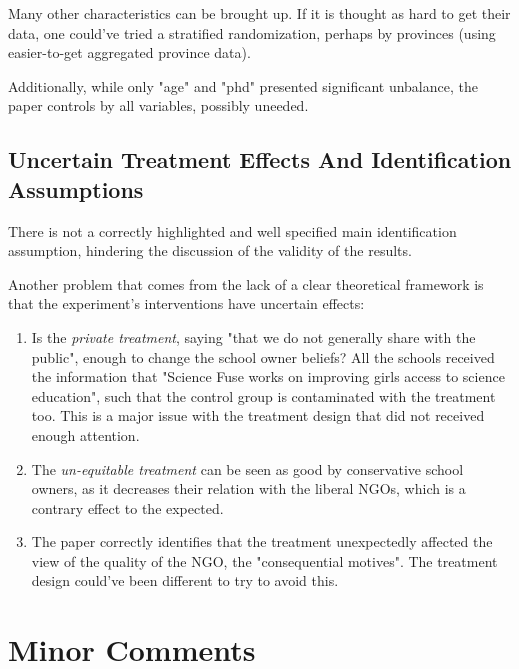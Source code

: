 \documentclass[12pt]{article}
\begin{document}
Many other characteristics can be brought up. If it is thought as hard to get their data, one could've tried a stratified randomization, perhaps by provinces (using easier-to-get aggregated province data).

Additionally, while only "age" and "phd" presented significant unbalance, the paper controls by all variables, possibly uneeded.


\subsection{Uncertain Treatment Effects And Identification Assumptions}

There is not a correctly highlighted and well specified main identification assumption, hindering the discussion of the validity of the results.

Another problem that comes from the lack of a clear theoretical framework is that the experiment's interventions have uncertain effects:

\begin{enumerate}
    \item Is the \textit{private treatment}, saying "that we do not generally share with the public", enough to change the school owner beliefs? All the schools received the information that "Science Fuse works on improving girls access to science education", such that the control group is contaminated with the treatment too. This is a major issue with the treatment design that did not received enough attention.
    \item The \textit{un-equitable treatment} can be seen as good by conservative school owners, as it decreases their relation with the liberal NGOs, which is a contrary effect to the expected.
    \item The paper correctly identifies that the treatment unexpectedly affected the view of the quality of the NGO, the "consequential motives". The treatment design could've been different to try to avoid this.
\end{enumerate}


\section{Minor Comments}
\end{document}
